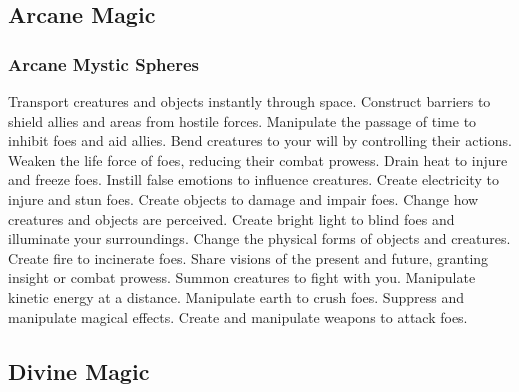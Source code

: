 
\small
\subsection{Arcane Magic}\label{Arcane Magic}
\subsubsection{Arcane Mystic Spheres}\label{Arcane Mystic Spheres}
\begin{spelllist}
 Transport creatures and objects instantly through space.
 Construct barriers to shield allies and areas from hostile forces.
 Manipulate the passage of time to inhibit foes and aid allies.
 Bend creatures to your will by controlling their actions.
 Weaken the life force of foes, reducing their combat prowess.
 Drain heat to injure and freeze foes.
 Instill false emotions to influence creatures.
 Create electricity to injure and stun foes.
 Create objects to damage and impair foes.
 Change how creatures and objects are perceived.
 Create bright light to blind foes and illuminate your surroundings.
 Change the physical forms of objects and creatures.
 Create fire to incinerate foes.
 Share visions of the present and future, granting insight or combat prowess.
 Summon creatures to fight with you.
 Manipulate kinetic energy at a distance.
 Manipulate earth to crush foes.
 Suppress and manipulate magical effects.
 Create and manipulate weapons to attack foes.
\end{spelllist}



\small
\subsection{Divine Magic}\label{Divine Magic}
